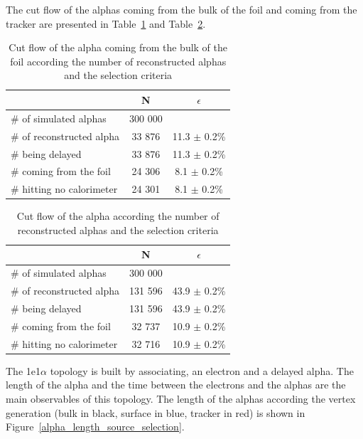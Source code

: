 \documentclass[main.tex]{subfiles}
\begin{document}
\bigskip


\noindent The cut flow of the alphas coming from the bulk of the foil and coming from the tracker are presented in Table~\ref{Cutflowalphabulk} and Table~\ref{Cutflowalphatrackerselection}. 


\begin{table}[h!]
\begin{center}
\begin{tabular}{l|c|c}
 & N & $\epsilon$ \\
\toprule
$\#$ of simulated alphas & 300 000 & \\
\hline
$\#$ of reconstructed alpha & 33 876 & 11.3 $\pm$ 0.2\% \\
$\#$ being delayed          & 33 876 & 11.3 $\pm$ 0.2\% \\
$\#$ coming from the foil   & 24 306 & 8.1  $\pm$ 0.2\% \\
$\#$ hitting no calorimeter & 24 301 & 8.1  $\pm$ 0.2\% \\
\bottomrule
\end{tabular}
\end{center}
\caption{Cut flow of the alpha coming from the bulk of the foil according the number of reconstructed alphas and the selection criteria}
\label{Cutflowalphabulk}
\end{table}


\begin{table}[h!]
\begin{center}
\begin{tabular}{l|c|c}
 & N & $\epsilon$ \\
\toprule
$\#$ of simulated alphas & 300 000 & \\
\hline
$\#$ of reconstructed alpha & 131 596 & 43.9 $\pm$ 0.2\% \\
$\#$ being delayed          & 131 596 & 43.9 $\pm$ 0.2\% \\
$\#$ coming from the foil   & 32 737  & 10.9 $\pm$ 0.2\% \\
$\#$ hitting no calorimeter & 32 716  & 10.9 $\pm$ 0.2\% \\
\bottomrule
\end{tabular}
\end{center}
\caption{Cut flow of the alpha according the number of reconstructed alphas and the selection criteria}
\label{Cutflowalphatrackerselection}
\end{table}


\bigskip


\noindent The 1e1$\alpha$ topology is built by associating, an electron and a delayed alpha. The length of the alpha and the time between the electrons and the alphas are the main observables of this topology. The length of the alphas according the vertex generation (bulk in black, surface in blue, tracker in red) is shown in Figure~\ref{alpha_length_source_selection}.
\end{document}
